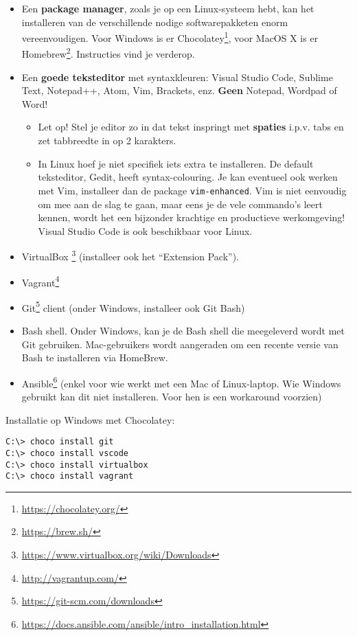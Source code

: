\begin{itemize}
  \item Een \textbf{package manager}, zoals je op een Linux-systeem hebt, kan het installeren van de verschillende nodige softwarepakketen enorm vereenvoudigen. Voor Windows is er Chocolatey\footnote{\url{https://chocolatey.org/}}, voor MacOS X is er Homebrew\footnote{\url{https://brew.sh/}}. Instructies vind je verderop.
  \item Een \textbf{goede teksteditor} met syntaxkleuren: Visual Studio Code, Sublime Text, Notepad++, Atom, Vim, Brackets, enz. \textbf{Geen} Notepad, Wordpad of Word!
  \begin{itemize}
    \item Let op! Stel je editor zo in dat tekst inspringt met \textbf{spaties} i.p.v. tabs en zet tabbreedte in op 2 karakters.
    \item In Linux hoef je niet specifiek iets extra te installeren. De default teksteditor, Gedit, heeft syntax-colouring. Je kan eventueel ook werken met Vim, installeer dan de package \texttt{vim-enhanced}. Vim is niet eenvoudig om mee aan de slag te gaan, maar eens je de vele commando's leert kennen, wordt het een bijzonder krachtige en productieve werkomgeving! Visual Studio Code is ook beschikbaar voor Linux.
  \end{itemize}
  \item VirtualBox \footnote{\url{https://www.virtualbox.org/wiki/Downloads}} (installeer ook het ``Extension Pack'').
  \item Vagrant\footnote{\url{http://vagrantup.com/}}
  \item Git\footnote{\url{https://git-scm.com/downloads}} client (onder Windows, installeer ook Git Bash)
  \item Bash shell. Onder Windows, kan je de Bash shell die meegeleverd wordt met Git gebruiken. Mac-gebruikers wordt aangeraden om een recente versie van Bash te installeren via HomeBrew.
  \item Ansible\footnote{\url{https://docs.ansible.com/ansible/intro_installation.html}} (enkel voor wie werkt met een Mac of Linux-laptop. Wie Windows gebruikt kan dit niet installeren. Voor hen is een workaround voorzien)
\end{itemize}

Installatie op Windows met Chocolatey:

\begin{verbatim}
C:\> choco install git
C:\> choco install vscode
C:\> choco install virtualbox
C:\> choco install vagrant
\end{verbatim}

